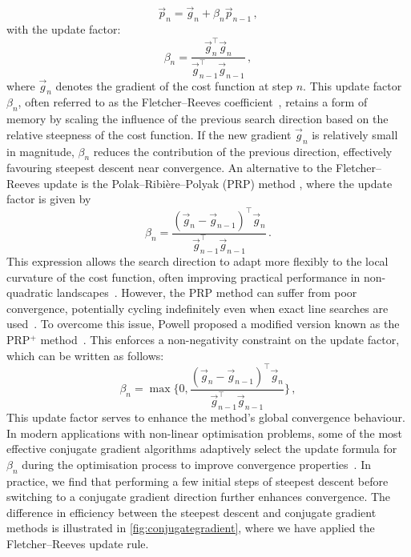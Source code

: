 \documentclass[../Thesis-IJspeert.tex]{subfiles}
\begin{document}
\begin{equation}
\vec{p}_{n} = \vec{g}_{n} + \beta_{n} \vec{p}_{n-1}\,,
\end{equation}
with the update factor:
\begin{equation}
\beta_{n} = \frac{\vec{g}_{n}^\top \vec{g}_{n}}{\vec{g}_{n-1}^\top \vec{g}_{n-1}}\,,
\end{equation}
where $\vec{g}_n$ denotes the gradient of the cost function at step $n$. This update factor $\beta_n$, often referred to as the Fletcher--Reeves coefficient~\cite{Fletcher1964}, retains a form of memory by scaling the influence of the previous search direction based on the relative steepness of the cost function. If the new gradient $\vec{g}_n$ is relatively small in magnitude, $\beta_n$ reduces the contribution of the previous direction, effectively favouring steepest descent near convergence. An alternative to the Fletcher--Reeves update is the Polak--Ribière--Polyak (PRP) method \cite{Polyak1969}, where the update factor is given by
\begin{equation}
\beta_n = \frac{(\vec{g}_n - \vec{g}_{n-1})^{\!\top} \vec{g}_n}{\vec{g}_{n-1}^\top \vec{g}_{n-1}}\,.
\end{equation}
This expression allows the search direction to adapt more flexibly to the local curvature of the cost function, often improving practical performance in non-quadratic landscapes~\cite{Polyak1969,M2AN_1969__3_1_35_0}. However, the PRP method can suffer from poor convergence, potentially cycling indefinitely even when exact line searches are used~\cite{Powell1984}. To overcome this issue, Powell proposed a modified version known as the PRP$^+$ method~\cite{Powell1984}. This enforces a non-negativity constraint on the update factor, which can be written as follows:
\begin{equation}
\beta_n = \max\Bigg\{0, \frac{(\vec{g}_n - \vec{g}_{n-1})^{\!\top} \vec{g}_n}{\vec{g}_{n-1}^{\top} \vec{g}_{n-1}} \Bigg\}\,,
\end{equation}
This update factor serves to enhance the method's global convergence behaviour. In modern applications with non-linear optimisation problems, some of the most effective conjugate gradient algorithms adaptively select the update formula for $\beta_n$ during the optimisation process to improve convergence properties~\cite{hager2006survey}. In practice, we find that performing a few initial steps of steepest descent before switching to a conjugate gradient direction further enhances convergence. The difference in efficiency between the steepest descent and conjugate gradient methods is illustrated in \autoref{fig:conjugategradient}, where we have applied the Fletcher--Reeves update rule.
\end{document}
